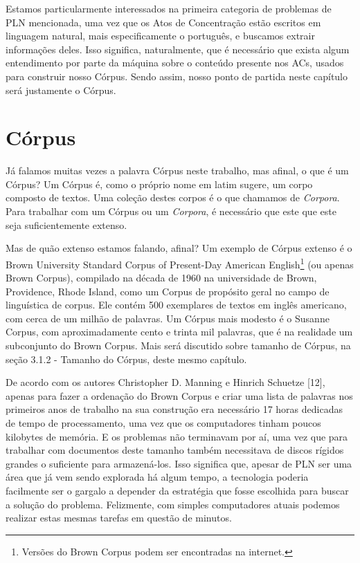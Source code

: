 \documentclass[11pt]{report}
\begin{document}
Estamos particularmente interessados na primeira
categoria de problemas de PLN mencionada, uma vez que os Atos de Concentração estão escritos em linguagem natural, mais especificamente o português, e buscamos extrair informações
deles. Isso significa, naturalmente, que é necessário que exista algum entendimento por parte da máquina sobre o conteúdo presente nos ACs, usados para construir nosso Córpus. Sendo
assim, nosso ponto de partida neste capítulo será justamente o Córpus.

\section{Córpus}

\indent\indent Já falamos muitas vezes a palavra Córpus neste trabalho, mas afinal, o que é um Córpus? Um Córpus é, como o próprio nome em latim sugere, um corpo composto de textos.
Uma coleção destes corpos é o que chamamos de \textit{Corpora}. Para trabalhar com um Córpus ou um \textit{Corpora}, é necessário que este que este seja suficientemente extenso.

Mas de quão extenso estamos falando, afinal? Um exemplo de Córpus extenso é o Brown University Standard Corpus of Present-Day American English\footnote[7]{
Versões do Brown Corpus podem ser encontradas na internet.} (ou apenas Brown Corpus), compilado na década de 1960 na universidade de Brown, Providence, Rhode Island, como um Corpus de
propósito geral no campo de linguística de corpus. Ele contém 500 exemplares de textos em inglês americano, com cerca de um milhão de palavras. Um Córpus mais modesto é o Susanne Corpus,
com aproximadamente cento e trinta mil palavras, que é na realidade um subconjunto do Brown Corpus. Mais será discutido sobre tamanho de Córpus, na seção 3.1.2 - Tamanho do Córpus,
deste mesmo capítulo.

De acordo com os autores Christopher D. Manning e Hinrich Schuetze [12], apenas para fazer a ordenação do Brown Corpus e criar uma lista de palavras nos primeiros anos de trabalho na
sua construção era necessário 17 horas dedicadas de tempo de processamento, uma vez que os computadores tinham poucos kilobytes de memória. E os problemas não terminavam por aí,
uma vez que para trabalhar com documentos deste tamanho também necessitava de discos rígidos grandes o suficiente para armazená-los. Isso significa que, apesar de PLN ser uma área
que já vem sendo explorada há algum tempo, a tecnologia poderia facilmente ser o gargalo a depender da estratégia que fosse escolhida para buscar a solução do problema. Felizmente,
com simples computadores atuais podemos realizar estas mesmas tarefas em questão de minutos.
\end{document}
